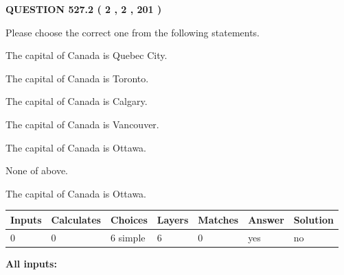 \documentclass[12pt]{article}
\begin{document}
   
  
\vspace{0.2in}
  
{\textbf{\Large{QUESTION
527.2 
 ( 2 , 2 , 201 )
}}}
  
  
Please choose the correct one from the following statements.
 
 
The capital of Canada is Quebec City.
 
 
The capital of Canada is Toronto.
 
 
The capital of Canada is Calgary.
 
 
The capital of Canada is Vancouver.
 
 
The capital of Canada is Ottawa.
 
 
 None of above.
 
 
\noindent{}
 
 
The capital of Canada is Ottawa.
 
 
\noindent{}
 
 
   
   
   
   
\noindent\begin{tabular}{|l|l|l|l|l|l|l|}
 \hline
Inputs & Calculates & Choices & Layers & Matches & Answer & Solution \\ \hline
 0  & 
 0  & 
 6
  simple  
  & 
 6  & 
 0  & 
  yes & 
  no 
  \\ \hline
 \end{tabular}
   
   
   
   
\noindent{}
   
   
   
   
\noindent\vspace{0.1in}\hspace{-0.08in} {\textbf{\Large{All inputs: }}}
   
   
   
   
   
   
 \vspace{0.2in}
 
   
   
\end{document}
